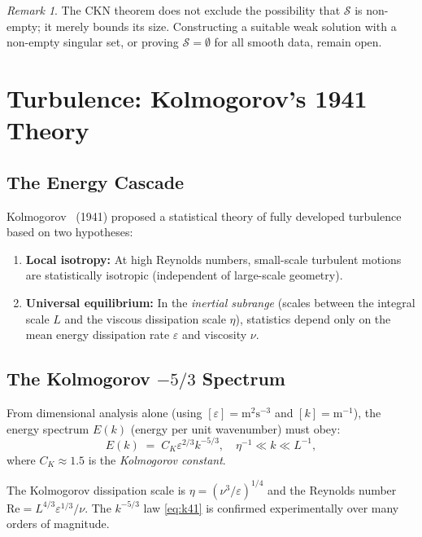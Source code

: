 \documentclass[12pt,a4paper]{article}
\theoremstyle{remark}
\newtheorem{remark}[theorem]{Remark}
\begin{document}
\begin{remark}
  The CKN theorem does not exclude the possibility that $\mathcal{S}$ is non-empty;
  it merely bounds its size.  Constructing a suitable weak solution with a non-empty
  singular set, or proving $\mathcal{S} = \emptyset$ for all smooth data, remain open.
\end{remark}

\section{Turbulence: Kolmogorov's 1941 Theory}

\subsection{The Energy Cascade}

Kolmogorov~\cite{Kolmogorov1941} (1941) proposed a statistical theory of fully developed
turbulence based on two hypotheses:
\begin{enumerate}[nosep]
  \item \textbf{Local isotropy:} At high Reynolds numbers, small-scale turbulent motions
    are statistically isotropic (independent of large-scale geometry).
  \item \textbf{Universal equilibrium:} In the \emph{inertial subrange} (scales between
    the integral scale $L$ and the viscous dissipation scale $\eta$), statistics depend
    only on the mean energy dissipation rate $\varepsilon$ and viscosity $\nu$.
\end{enumerate}

\subsection{The Kolmogorov $-5/3$ Spectrum}

From dimensional analysis alone (using $[\varepsilon] = \text{m}^2\text{s}^{-3}$ and
$[k] = \text{m}^{-1}$), the energy spectrum $E(k)$ (energy per unit wavenumber) must obey:
\begin{equation}\label{eq:k41}
  E(k) \;=\; C_K \varepsilon^{2/3} k^{-5/3}, \quad \eta^{-1} \ll k \ll L^{-1},
\end{equation}
where $C_K \approx 1.5$ is the \emph{Kolmogorov constant}.

The Kolmogorov dissipation scale is $\eta = (\nu^3/\varepsilon)^{1/4}$ and the Reynolds
number $\mathrm{Re} = L^{4/3}\varepsilon^{1/3}/\nu$.  The $k^{-5/3}$ law
\eqref{eq:k41} is confirmed experimentally over many orders of magnitude.
\end{document}
